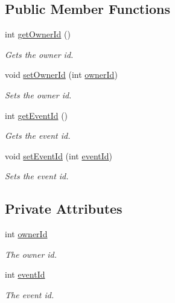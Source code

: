 \subsection*{Public Member Functions}
\begin{DoxyCompactItemize}
\item 
int \hyperlink{classbr_1_1unb_1_1unbomber_1_1core_1_1_event_a6664da33d66d769369d541aae165d53b}{get\+Owner\+Id} ()
\begin{DoxyCompactList}\small\item\em Gets the owner id. \end{DoxyCompactList}\item 
void \hyperlink{classbr_1_1unb_1_1unbomber_1_1core_1_1_event_a7bc6c6836753666cd2cce8723ec4f9e8}{set\+Owner\+Id} (int \hyperlink{classbr_1_1unb_1_1unbomber_1_1core_1_1_event_afd44621bcd3e242d33eaad558310bedd}{owner\+Id})
\begin{DoxyCompactList}\small\item\em Sets the owner id. \end{DoxyCompactList}\item 
int \hyperlink{classbr_1_1unb_1_1unbomber_1_1core_1_1_event_a09fa9007d66f05dc04c23bf9ffbc1f75}{get\+Event\+Id} ()
\begin{DoxyCompactList}\small\item\em Gets the event id. \end{DoxyCompactList}\item 
void \hyperlink{classbr_1_1unb_1_1unbomber_1_1core_1_1_event_aa435f70b501ff06c1e33f5a8ebdc8cfe}{set\+Event\+Id} (int \hyperlink{classbr_1_1unb_1_1unbomber_1_1core_1_1_event_a3df54ae61fbfbe2ec356abe70b0bcf55}{event\+Id})
\begin{DoxyCompactList}\small\item\em Sets the event id. \end{DoxyCompactList}\end{DoxyCompactItemize}
\subsection*{Private Attributes}
\begin{DoxyCompactItemize}
\item 
int \hyperlink{classbr_1_1unb_1_1unbomber_1_1core_1_1_event_afd44621bcd3e242d33eaad558310bedd}{owner\+Id}
\begin{DoxyCompactList}\small\item\em The owner id. \end{DoxyCompactList}\item 
int \hyperlink{classbr_1_1unb_1_1unbomber_1_1core_1_1_event_a3df54ae61fbfbe2ec356abe70b0bcf55}{event\+Id}
\begin{DoxyCompactList}\small\item\em The event id. \end{DoxyCompactList}\end{DoxyCompactItemize}


